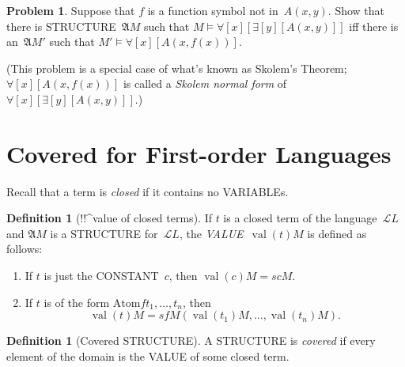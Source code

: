 \documentclass[10pt,a4paper]{article}
\newcommand*{\olup}[1]{\MakeUppercase{#1}}
\theoremstyle{plain}
\theoremstyle{definition}
\newtheorem{defn}[thm]{Definition}
\newtheorem{prob}{Problem}[section]
\theoremstyle{remark}
\newenvironment{explain}{}{}
\newcommand*{\olfileid}[3]{}
\newcommand*{\olsection}[1]{\section*{#1}}
\providecommand{\lforall}{\mathord{\forall}}
\providecommand{\lexists}{\mathord{\exists}}
\providecommand{\Struct}{\ensuremath{\mathfrak{A}}}
\providecommand{\Assign}{\ensuremath{s}}
\providecommand{\Sat}[2]{\ensuremath{#1 \models #2}}
\providecommand{\Lang}{\ensuremath{\mathcal{L}}}
\providecommand{\Value}[1]{\operatorname{val}(#1)}
\providecommand{\Atom}{\mathrm{Atom}}
\begin{document}
\begin{prob}
Suppose that $f$ is a function symbol not in~$A(x,y)$. Show that
there is \olup{structure}~$\Struct{M}$ such that
$\Sat{M}{\lforall[x][\lexists[y][A(x,y)]]}$ iff there is an~$\Struct
M'$ such that $\Sat{M'}{\lforall[x][A(x,f(x))]}$.

(This problem is a special case of what's known as Skolem's Theorem;
$\lforall[x][A(x,f(x))]$ is called a \emph{Skolem normal form} of
$\lforall[x][\lexists[y][A(x,y)]]$.)
\end{prob}





\olfileid{fol}{syn}{cov}

\olsection{Covered  for First-order Languages}

\begin{explain}
Recall that a term is \emph{closed} if it contains no \olup{variable}s.
\end{explain}

\begin{defn}[!!^{value} of closed terms]
If $t$ is a closed term of the language~$\Lang L$ and $\Struct M$ is a
\olup{structure} for~$\Lang L$, the \emph{\olup{value}}~$\Value{t}{M}$ is
defined as follows:
\begin{enumerate}
\item If $t$ is just the \olup{constant}~$c$, then $\Value{c}{M} = \Assign{c}{M}$.
\item If $t$ is of the form $\Atom{f}{t_1, \ldots, t_n}$, then
  \[
  \Value{t}{M} = \Assign{f}{M}(\Value{t_1}{M}, \ldots,
  \Value{t_n}{M}).
  \]
\end{enumerate}
\end{defn}

\begin{defn}[Covered \olup{structure}]
A \olup{structure} is \emph{covered} if every element of the domain is the
\olup{value} of some closed term.
\end{defn}
\end{document}
